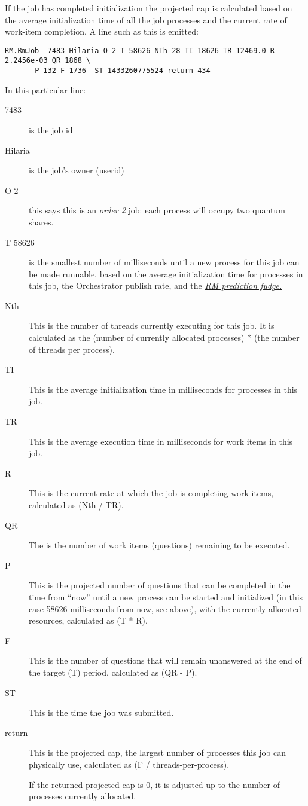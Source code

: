    If the job has completed initialization the projected cap is calculated based on 
   the average initialization time of all the job processes and the current rate of
   work-item completion.  A line such as this is emitted:
\begin{verbatim}
RM.RmJob- 7483 Hilaria O 2 T 58626 NTh 28 TI 18626 TR 12469.0 R 2.2456e-03 QR 1868 \
       P 132 F 1736  ST 1433260775524 return 434
\end{verbatim}
   In this particular line:
      \begin{description}
        \item[7483] is the job id
        \item[Hilaria] is the job's owner (userid)
        \item[O 2] this says this is an {\em order 2} job: each process will occupy two quantum shares.
        \item[T 58626] is the smallest number of milliseconds until a new process for this job
          can be made runnable, based on the average initialization time for processes in
          this job, the Orchestrator publish rate, and the
          \hyperref[itm:props-rm.prediction.fudge]{\em RM prediction fudge.}
        \item[Nth] This is the number of threads currently executing for this job.  It is 
          calculated as the (number of currently allocated processes) * (the number of threads
          per process).
        \item[TI] This is the average initialization time in milliseconds for processes in this job.
        \item[TR] This is the average execution time in milliseconds for work items in this job.
        \item[R] This is the current rate at which the job is completing work items, 
          calculated as (Nth / TR).
        \item[QR] The is the number of work items (questions) remaining to be executed.
        \item[P] This is the projected number of questions that can be completed
          in the time from ``now'' until a new process can be started and initialized
          (in this case 58626 milliseconds from now, see above), with the currently
          allocated resources, calculated as (T * R).
        \item[F] This is the number of questions that will remain unanswered at the
          end of the target (T) period, calculated as (QR - P).
        \item[ST] This is the time the job was submitted.
        \item[return] This is the projected cap, the largest number of processes this
          job can physically use, calculated as (F / threads-per-process).
          
          If the returned projected cap is 0, it is adjusted up to the number of
          processes currently allocated.
      \end{description}
          
